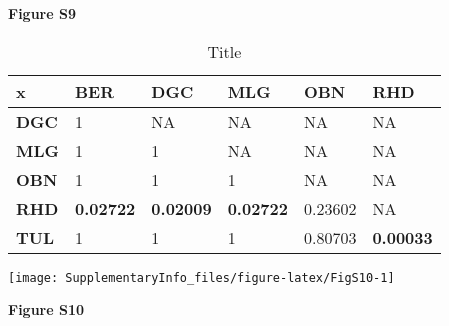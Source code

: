 \documentclass[12pt,]{article}
\begin{document}
\textbf{Figure S9}

\pagebreak

\newpage
\begingroup\fontsize{10}{12}\selectfont

\begin{longtable}{>{\bfseries}llllll}
\caption{\label{tab:Table S5}Title}\\
\toprule
\textbf{x} & \textbf{BER} & \textbf{DGC} & \textbf{MLG} & \textbf{OBN} & \textbf{RHD}\\
\midrule
DGC & 1 & NA & NA & NA & NA\\
MLG & 1 & 1 & NA & NA & NA\\
OBN & 1 & 1 & 1 & NA & NA\\
RHD & \textbf{0.02722} & \textbf{0.02009} & \textbf{0.02722} & 0.23602 & NA\\
TUL & 1 & 1 & 1 & 0.80703 & \textbf{0.00033}\\
\bottomrule
\end{longtable}
\endgroup{}

\pagebreak

\newpage

\begin{center}\texttt{[image: SupplementaryInfo\_files/figure-latex/FigS10-1]} \end{center}

\textbf{Figure S10}

\pagebreak

\pagebreak

\begingroup\fontsize{10}{12}\selectfont
\end{document}
